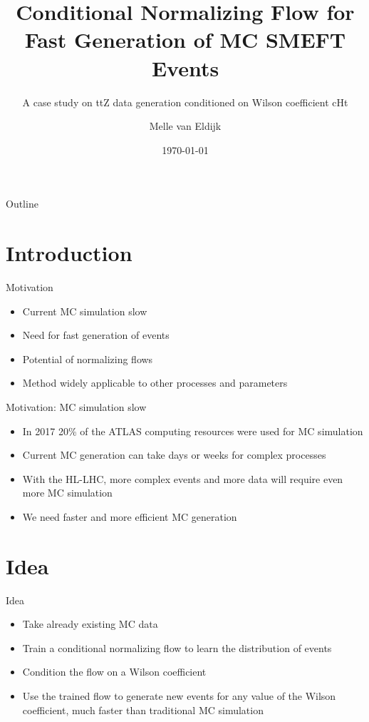 \documentclass[aspectratio=169]{beamer}
\title[CNF for Fast Generation of MC SMEFT Events]{Conditional Normalizing Flow for Fast Generation of MC SMEFT Events}
\subtitle{A case study on ttZ data generation conditioned on Wilson coefficient cHt}
\author[Melle van Eldijk]{Melle van Eldijk}
\institute[NIKHEF and UvA]{NIKHEF and University of Amsterdam}
\date{\today}
\begin{document}
\begin{frame}
  \titlepage
\end{frame}

\begin{frame}{Outline}
  \tableofcontents
\end{frame}

\section{Introduction}

\begin{frame}{Motivation}
  \begin{itemize}
    \item Current MC simulation slow
    \item Need for fast generation of events
    \item Potential of normalizing flows
    \item Method widely applicable to other processes and parameters
  \end{itemize}
\end{frame}

\begin{frame}{Motivation: MC simulation slow}
    \begin{itemize}
    \item In 2017 20\% of the ATLAS computing resources were used for MC simulation \cite{hsf2021mcgen}
    \item Current MC generation can take days or weeks for complex processes
    \item With the HL-LHC, more complex events and more data will require even more MC simulation
    \item We need faster and more efficient MC generation
    \end{itemize}
    
\end{frame}

\section{Idea}
\begin{frame}{Idea}
  \begin{itemize}
    \item Take already existing MC data
    \item Train a conditional normalizing flow to learn the distribution of events
    \item Condition the flow on a Wilson coefficient 
    \item Use the trained flow to generate new events for any value of the Wilson coefficient, much faster than traditional MC simulation
  \end{itemize}
\end{frame}
\end{document}
